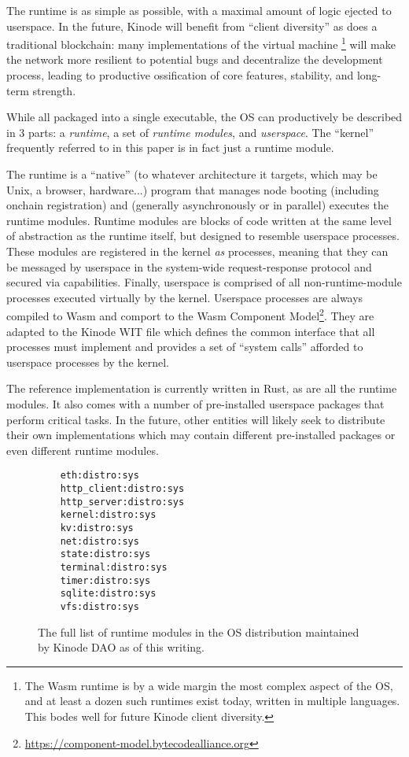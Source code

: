\documentclass[runningheads]{llncs}
\begin{document}
The runtime is as simple as possible, with a maximal amount of logic ejected to userspace.
In the future, Kinode will benefit from ``client diversity'' as does a traditional blockchain: many implementations of the virtual machine
\footnote{The Wasm runtime is by a wide margin the most complex aspect of the OS, and at least a dozen such runtimes exist today, written in multiple languages.
This bodes well for future Kinode client diversity.}
will make the network more resilient to potential bugs and decentralize the development process, leading to productive ossification of core features, stability, and long-term strength.

While all packaged into a single executable, the OS can productively be described in 3 parts: a \textit{runtime}, a set of \textit{runtime modules}, and \textit{userspace}.
The ``kernel'' frequently referred to in this paper is in fact just a runtime module.

The runtime is a ``native'' (to whatever architecture it targets, which may be Unix, a browser, hardware...) program that manages node booting (including onchain registration) and (generally asynchronously or in parallel) executes the runtime modules.
Runtime modules are blocks of code written at the same level of abstraction as the runtime itself, but designed to resemble userspace processes.
These modules are registered in the kernel \textit{as} processes, meaning that they can be messaged by userspace in the system-wide request-response protocol and secured via capabilities.
Finally, userspace is comprised of all non-runtime-module processes executed virtually by the kernel.
Userspace processes are always compiled to Wasm and comport to the Wasm Component Model\footnote{\url{https://component-model.bytecodealliance.org}}.
They are adapted to the Kinode WIT file which defines the common interface that all processes must implement and provides a set of ``system calls'' afforded to userspace processes by the kernel.

The reference implementation is currently written in Rust, as are all the runtime modules.
It also comes with a number of pre-installed userspace packages that perform critical tasks.
In the future, other entities will likely seek to distribute their own implementations which may contain different pre-installed packages or even different runtime modules.

\begin{figure}
    \centering
    \begin{lstlisting}
    eth:distro:sys
    http_client:distro:sys
    http_server:distro:sys
    kernel:distro:sys
    kv:distro:sys
    net:distro:sys
    state:distro:sys
    terminal:distro:sys
    timer:distro:sys
    sqlite:distro:sys
    vfs:distro:sys
    \end{lstlisting}
    \caption{The full list of runtime modules in the OS distribution maintained by Kinode DAO as of this writing.}
    \label{fig:runtime modules list}
\end{figure}
\end{document}

